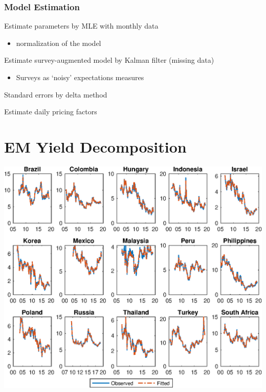 \documentclass[12pt, aspectratio=169, xcolor=dvipsnames]{beamer}
\begin{document}
\begin{frame}
\frametitle{Model Estimation}

Estimate parameters by MLE with monthly data
\begin{itemize}
\item \cite*{JSZ:2011} normalization of the model
\end{itemize}

Estimate survey-augmented model by Kalman filter (missing data)
\begin{itemize}
\item Surveys as \alert{`noisy'} expectations measures \citep{KimOrphanides:2012}
\end{itemize}

Standard errors by delta method

Estimate daily pricing factors

\end{frame}


\section{EM Yield Decomposition}


\begin{frame}[label=ModelFit]
\begin{center}							%
\includegraphics[trim={0cm 0cm 0cm 0cm},clip,height=0.95\textheight,width=\linewidth]{../Figures/Estimation/s_ylds_bsl_yQ.eps} \\
\end{center}
\end{frame}
\end{document}
